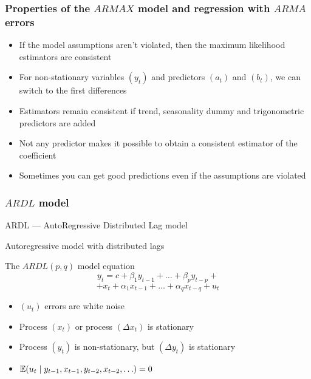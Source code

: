 \begin{frame}
	\frametitle{Properties of the $ARMAX$ model and regression with $ARMA$ errors}
	
	\begin{itemize}[<+->]
		\item If the model assumptions aren't violated, then the maximum likelihood estimators \alert{are consistent}
		\item For non-stationary variables $(y_t)$ and predictors $(a_t)$ and $(b_t)$, we can switch to the first \alert{differences}
		\item Estimators \alert{remain} consistent if trend, seasonality dummy and trigonometric predictors are added
		\item \alert{Not any} predictor makes it possible to obtain a consistent estimator of the coefficient
		\item \alert{Sometimes} you can get good predictions even if the assumptions are violated
	\end{itemize}
	
\end{frame}



\begin{frame}
	\frametitle{$ARDL$ model}
	
	\alert{ARDL} — \alert{A}uto\alert{R}egressive \alert{D}istributed \alert{L}ag model
	
	Autoregressive model with distributed lags
	
	\begin{block}{The $ARDL(p, q)$ model equation}
		\[
		y_t = c + \beta_1 y_{t-1} + \ldots + \beta_p y_{t-p} + 
		\]
		\[
		+ x_t + \alpha_1 x_{t-1} + \ldots + \alpha_q x_{t-q} + u_t
		\]

	\end{block}
	\pause
	\begin{itemize}[<+->]
		\item $(u_t)$ errors are \alert{white noise}
		\item Process $(x_t)$ \alert{or} process $(\Delta x_t)$ is stationary
		\item Process $(y_t)$ is \alert{non-stationary}, but $(\Delta y_t)$ is stationary
		\item $\mathbb{E}(u_t \mid y_{t-1}, x_{t-1}, y_{t-2}, x_{t-2}, \ldots) = 0$
	\end{itemize}
	
\end{frame}

